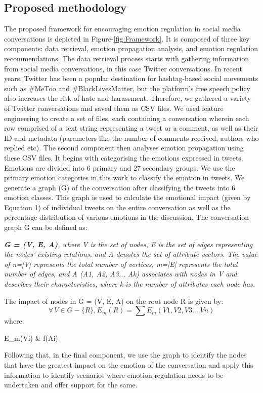 \subsection{Proposed methodology}
The proposed framework for encouraging emotion regulation in social media conversations is depicted in Figure-\ref{fig:Framework}. It is composed of three key components: data retrieval, emotion propagation analysis, and emotion regulation recommendations. The data retrieval process starts with gathering information from social media conversations, in this case Twitter conversations. In recent years, Twitter has been a popular destination for hashtag-based social movements such as \#MeToo and \#BlackLivesMatter, but the platform's free speech policy also increases the risk of hate and harassment. Therefore, we gathered a variety of Twitter conversations and saved them as CSV files. We used feature engineering to create a set of files, each containing a conversation wherein each row comprised of a text string representing a tweet or a comment, as well as their ID and metadata (parameters like the number of comments received, authors who replied etc). The second component then analyses emotion propagation using these CSV files. It begins with categorising the emotions expressed in tweets. Emotions are divided into 6 primary and 27 secondary groups. We use the primary emotion categories in this work to classify the emotion in tweets. We generate a graph (G) of the conversation after classifying the tweets into 6 emotion classes. This graph is used to calculate the emotional impact (given by Equation 1) of individual tweets on the entire conversation as well as the percentage distribution of various emotions in the discussion. 
The conversation graph G can be defined as:


\textit{\textbf{G = (V, E, A)}, where V is the set of nodes, E is the set of edges representing the nodes' existing relations, and A denotes the set of attribute vectors. The value of n=|V| represents the total number of vertices, m=|E| represents the total number of edges, and A (A1, A2, A3... Ak) associates with nodes in V and describes their characteristics, where k is the number of attributes each node has.}



The impact of nodes in G = (V, E, A) on the root node R is given by:
\begin{equation}
\forall \,V \in G-\{R\},
E_{m}(R) = \sum{E_{m}(V1, V2, V3....Vn)}
\end{equation}
where:
\begin{conditions}
E_{m}(Vi) & f(Ai)
\end{conditions}
Following that, in the final component, we use the graph to identify the nodes that have the greatest impact on the emotion of the conversation and apply this information to identify scenarios where emotion regulation needs to be undertaken and offer support for the same.
 
